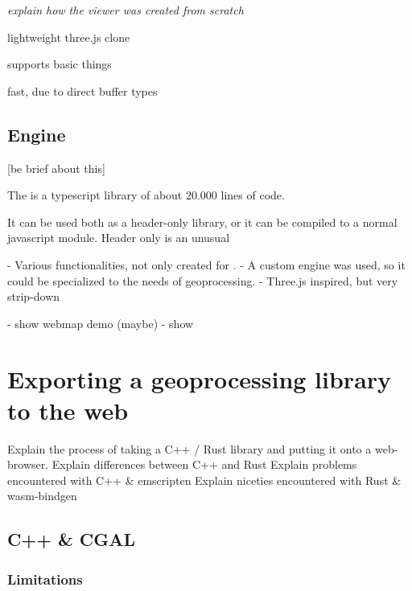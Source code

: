 \emph{explain how the viewer was created from scratch}

lightweight three.js clone

supports basic things

fast, due to direct buffer types



\subsection{Engine}
[be brief about this]

The  is a typescript library of about 20.000 lines of code. 

It can be used both as a header-only library, or it can be compiled to a normal javascript module. 
Header only is an unusual 

- Various functionalities, not only created for \geofront{}.
- A custom engine was used, so it could be specialized to the needs of geoprocessing. 
- Three.js inspired, but very strip-down

- show webmap demo (maybe)
- show 

\newpage
\section{Exporting a geoprocessing library to the web}

\begin{note}
Explain the process of taking a C++ / Rust library and putting it onto a web-browser.
Explain differences between C++ and Rust 
Explain problems encountered with C++ & emscripten
Explain niceties encountered with Rust & wasm-bindgen
\end{note}


\subsection{C++ \& CGAL}

\subsubsection{Limitations}

